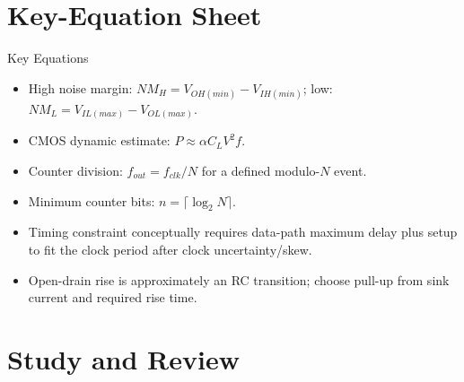 \documentclass[10pt,letterpaper]{article}
\begin{document}
\section{Key-Equation Sheet}
\begin{CornellExamBox}{Key Equations}
\begin{itemize}
  \item High noise margin: $NM_H=V_{OH(min)}-V_{IH(min)}$; low: $NM_L=V_{IL(max)}-V_{OL(max)}$.
  \item CMOS dynamic estimate: $P\approx\alpha C_LV^2f$.
  \item Counter division: $f_{out}=f_{clk}/N$ for a defined modulo-$N$ event.
  \item Minimum counter bits: $n=\lceil\log_2N\rceil$.
  \item Timing constraint conceptually requires data-path maximum delay plus setup to fit the clock period after clock uncertainty/skew.
  \item Open-drain rise is approximately an RC transition; choose pull-up from sink current and required rise time.
\end{itemize}\end{CornellExamBox}
\section{Study and Review}
\end{document}
